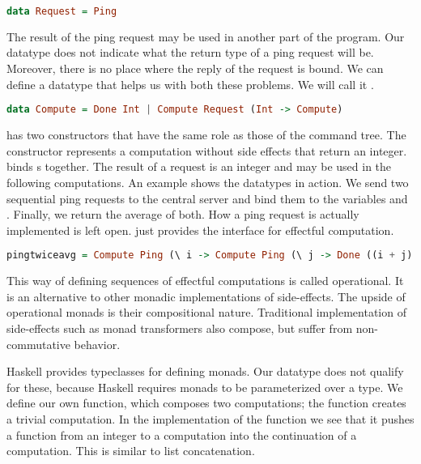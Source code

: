 \begin{lstlisting}[language=Haskell]
data Request = Ping
\end{lstlisting}

The result of the ping request may be used in another part of the program. Our  datatype does not indicate what the return type of a ping request will be. Moreover, there is no place where the reply of the request is bound. We can define a datatype that helps us with both these problems. We will call it .

\begin{lstlisting}[language=Haskell]
data Compute = Done Int | Compute Request (Int -> Compute)
\end{lstlisting}

 has two constructors that have the same role as those of the command tree. The  constructor represents a computation without side effects that return an integer.  binds s together. The result of a request is an integer and may be used in the following computations. An example shows the datatypes in action. We send two sequential ping requests to the central server and bind them to the variables  and . Finally, we return the average of both. How a ping request is actually implemented is left open.  just provides the interface for effectful computation.

\begin{lstlisting}[language=Haskell]
pingtwiceavg = Compute Ping (\ i -> Compute Ping (\ j -> Done ((i + j) `div` 2)))
\end{lstlisting}

This way of defining sequences of effectful computations is called operational\autocite{operationalmonad}. It is an alternative to other monadic implementations of side-effects. The upside of operational monads is their compositional nature. Traditional implementation of side-effects such as monad transformers\autocite{DBLP:conf/popl/LiangHJ95} also compose, but suffer from non-commutative behavior\autocite{DBLP:conf/ifl/DayH13}.

Haskell provides typeclasses for defining monads. Our  datatype does not qualify for these, because Haskell requires monads to be parameterized over a type. We define our own  function, which composes two computations; the  function creates a trivial computation. In the implementation of the  function we see that it pushes a function from an integer to a computation into the continuation of a computation. This is similar to list concatenation.

